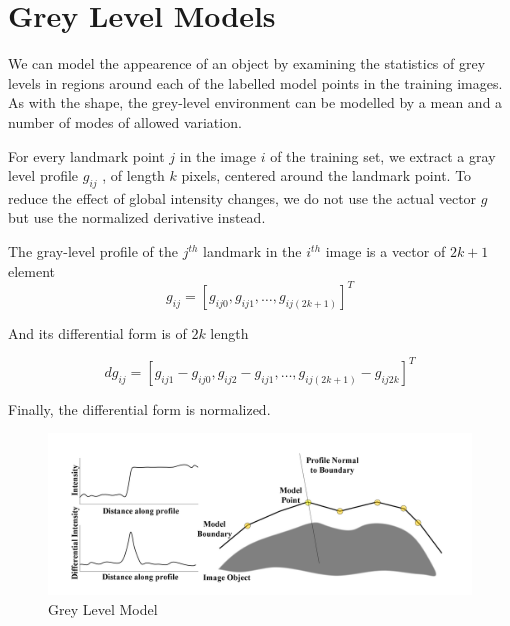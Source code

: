 \section{Grey Level Models}
We can model the appearence of an object by examining
the statistics of grey levels in regions around each
of the labelled model points in the training images.
As with the shape, the grey-level environment can be
modelled by a mean and a number of modes of allowed variation.

For every landmark point $j$ in the image $i$ of the
training set, we extract a gray level profile $g_{ij}$ , of length
$k$ pixels, centered around the landmark point.
To reduce the effect of global intensity changes, we do not use
the actual vector $g$ but use the normalized derivative instead.

The gray-level profile of the $j^{th}$ landmark in the $i^{th}$
image is a vector of $2k+1$ element
$${g_{ij} =  [g_{ij0}, g_{ij1}, \ldots, g_{ij(2k+1)}]}^T$$

And its differential form is of $2k$ length

$$ {dg_{ij} =  [g_{ij1} - g_{ij0}, g_{ij2} - g_{ij1}, \ldots, g_{ij(2k+1)}  - g_{ij 2k}]}^T$$

Finally, the differential form is normalized.

\begin{figure}[h]
  \centering
  \includegraphics[width=\linewidth]{img/grey-level}
  \caption{Grey Level Model}
\end{figure}
